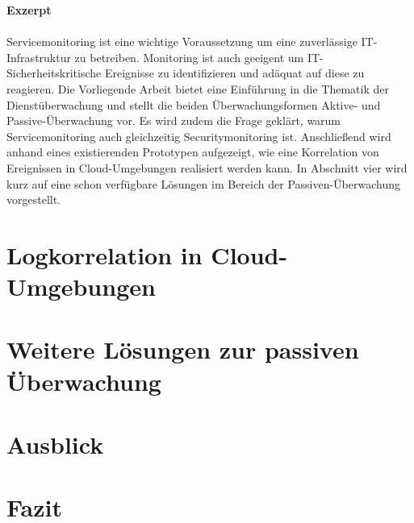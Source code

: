 \documentclass[a4paper,10pt]{scrreprt}
\begin{document}
\vspace*{\fill}
\textbf{Exzerpt}\\\\
    Servicemonitoring ist eine wichtige Voraussetzung um eine zuverlässige 
    IT-Infrastruktur zu betreiben. Monitoring ist auch geeigent um IT-Sicherheitskritische
    Ereignisse zu identifizieren und adäquat auf diese zu reagieren. Die Vorliegende
    Arbeit bietet eine Einführung in die Thematik der Dienstüberwachung und stellt die
    beiden Überwachungsformen Aktive- und Passive-Überwachung vor. Es wird zudem
    die Frage geklärt, warum Servicemonitoring auch gleichzeitig Securitymonitoring ist.
    Anschließend wird
    anhand eines existierenden Prototypen aufgezeigt, wie eine Korrelation von 
    Ereignissen in Cloud-Umgebungen realisiert werden kann. In Abschnitt vier wird
    kurz auf eine schon verfügbare Lösungen im Bereich der Passiven-Überwachung 
    vorgestellt. 
\vspace*{\fill}


\tableofcontents
\thispagestyle{fancy}


\cleardoubleemptypage

\chapter{Logkorrelation in Cloud-Umgebungen}
\thispagestyle{fancy}

\chapter{Weitere Lösungen zur passiven Überwachung}\label{elk}
\thispagestyle{fancy}

\chapter{Ausblick}
\thispagestyle{fancy}

\chapter{Fazit}
\thispagestyle{fancy}

{}

\thispagestyle{fancy}

\listoffigures
\thispagestyle{fancy}
\end{document}
